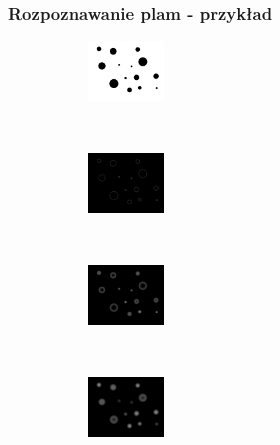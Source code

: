 \begin{frame}
\frametitle{Rozpoznawanie plam - przykład}

\begin{figure}[h]
\begin{center}
\begin{subfigure}[b]{2cm}
                 \centering
                 \includegraphics[width=2cm]{original.jpg}
         \end{subfigure}%
		 ~
\begin{subfigure}[b]{2cm}
\centering
\includegraphics[width=2cm]{circles1.jpg}
\end{subfigure}~
\begin{subfigure}[b]{2cm}
\centering
\includegraphics[width=2cm]{circles2.jpg}
\end{subfigure}~
\begin{subfigure}[b]{2cm}
\centering
\includegraphics[width=2cm]{circles3.jpg}
\end{subfigure}



\end{center}
\end{figure}
\end{frame}
